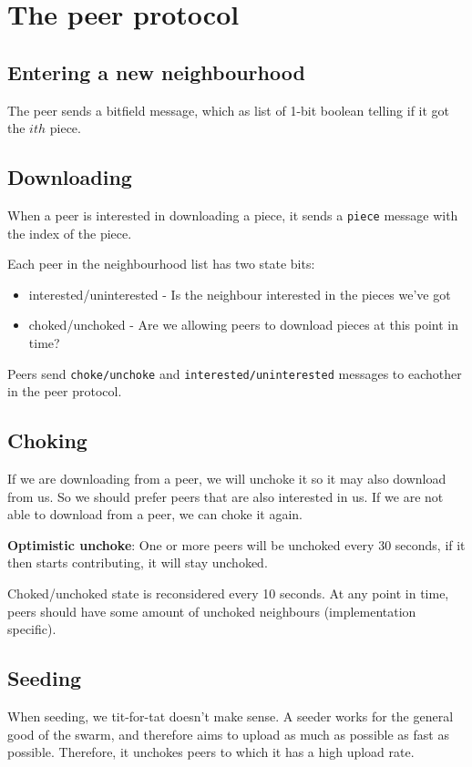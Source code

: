 	\section{The peer protocol}
	
	\subsection{Entering a new neighbourhood}
	The peer sends a bitfield message, which as list of 1-bit boolean telling if it got the $ith$ piece.
	
	\subsection{Downloading}
	When a peer is interested in downloading a piece, it sends a \texttt{piece} message with the index of the piece.
	
	Each peer in the neighbourhood list has two state bits: 
	\begin{itemize}
		\item interested/uninterested - Is the neighbour interested in the pieces we've got
		\item choked/unchoked - Are we allowing peers to download pieces at this point in time?
	\end{itemize}
	
	Peers send \texttt{choke/unchoke} and \texttt{interested/uninterested} messages to eachother in the peer protocol.
	
	\subsection{Choking}
	If we are downloading from a peer, we will unchoke it so it may also download from us. So we should prefer peers that are also interested in us. If we are not able to download from a peer, we can choke it again.
	
	\textbf{Optimistic unchoke}: One or more peers will be unchoked every 30 seconds, if it then starts contributing, it will stay unchoked.
	
	Choked/unchoked state is reconsidered every 10 seconds. At any point in time, peers should have some amount of unchoked neighbours (implementation specific).
	
	\subsection{Seeding}
	When seeding, we tit-for-tat doesn't make sense. A seeder works for the general good of the swarm, and therefore aims to upload as much as possible as fast as possible. Therefore, it unchokes peers to which it has a high upload rate.
	
